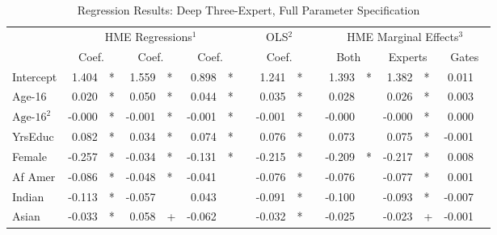 \documentclass[12pt]{article}
\theoremstyle{definition}
\begin{document}
  
  \begin{landscape}
    \begin{table} \centering
      \caption{Regression Results: Deep Three-Expert, Full Parameter Specification}
        \begin{threeparttable}
          \begin{tabular}[l]{l r l r l r l c r l c r l r l r l}
    
    \cmidrule{1-17}
    & \multicolumn{6}{c}{HME Regressions$^{1}$} &&  \multicolumn{2}{c}{OLS$^{2}$} && \multicolumn{6}{c}{HME Marginal Effects$^{3}$} \\
    \cmidrule(l){2-7}    \cmidrule(l){9-10}     \cmidrule(l){12-17}
    & \multicolumn{2}{c}{Coef.} &  \multicolumn{2}{c}{Coef.} &  \multicolumn{2}{c}{Coef.}  && \multicolumn{2}{c}{Coef.} && \multicolumn{2}{c}{Both}    &  \multicolumn{2}{c}{Experts}  &  \multicolumn{2}{c}{Gates} \\
                    \cmidrule(l){2-3} \cmidrule(l){4-5} \cmidrule(l){6-7} \cmidrule(l){9-10} \cmidrule(l){12-13} \cmidrule(l){14-15} \cmidrule(l){16-17}
    Intercept             &  1.404 & *      &  1.559 & *      &  0.898 & *      &&  1.241 & *     &&  1.393 & *        &  1.382 & *        &  0.011 &        \\
    Age-16                &  0.020 & *      &  0.050 & *      &  0.044 & *      &&  0.035 & *     &&  0.028 &          &  0.026 & *        &  0.003 &        \\
    $\textrm{Age-16}^{2}$ & -0.000 & *      & -0.001 & *      & -0.001 & *      && -0.001 & *     && -0.000 &          & -0.000 & *        &  0.000 &        \\
    YrsEduc               &  0.082 & *      &  0.034 & *      &  0.074 & *      &&  0.076 & *     &&  0.073 &          &  0.075 & *        & -0.001 &        \\
    Female                & -0.257 & *      & -0.034 & *      & -0.131 & *      && -0.215 & *     && -0.209 & *        & -0.217 & *        &  0.008 &        \\
    Af Amer               & -0.086 & *      & -0.048 & *      & -0.041 &        && -0.076 & *     && -0.076 &          & -0.077 & *        &  0.001 &        \\
    Indian                & -0.113 & *      & -0.057 &        &  0.043 &        && -0.091 & *     && -0.100 &          & -0.093 & *        & -0.007 &        \\
    Asian                 & -0.033 & *      &  0.058 & +      & -0.062 &        && -0.032 & *     && -0.025 &          & -0.023 & +        & -0.001 &        \\

\end{tabular}
\end{threeparttable}
\end{table}
\end{landscape}
\end{document}
